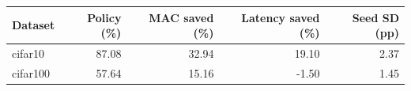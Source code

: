 \begin{tabular}{lrrrr}
\hline
Dataset & Policy (\%) & MAC saved (\%) & Latency saved (\%) & Seed SD (pp) \\
\hline
cifar10 & 87.08 & 32.94 & 19.10 & 2.37 \\
cifar100 & 57.64 & 15.16 & -1.50 & 1.45 \\
\hline
\end{tabular}
